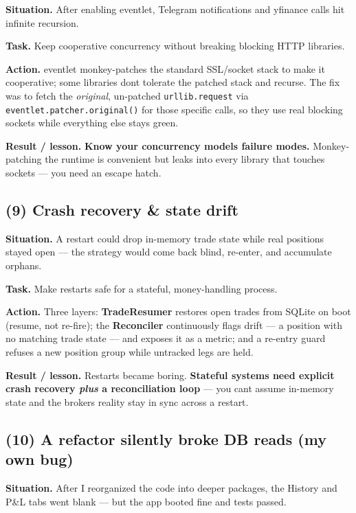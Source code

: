 \documentclass[11pt]{article}
\begin{document}
\textbf{Situation.} After enabling eventlet, Telegram notifications and yfinance calls hit infinite
recursion.

\textbf{Task.} Keep cooperative concurrency without breaking blocking HTTP libraries.

\textbf{Action.} eventlet monkey-patches the standard SSL/socket stack to make it cooperative; some
libraries don\textquotesingle t tolerate the patched stack and recurse. The fix was to fetch the \emph{original},
un-patched \texttt{urllib.request} via \texttt{eventlet.patcher.original()} for those specific calls, so they
use real blocking sockets while everything else stays green.

\textbf{Result / lesson.} \textbf{Know your concurrency model\textquotesingle s failure modes.} Monkey-patching the runtime
is convenient but leaks into every library that touches sockets --- you need an escape hatch.

\subsection{(9) Crash recovery \& state drift}\label{9-crash-recovery--state-drift}

\textbf{Situation.} A restart could drop in-memory trade state while real positions stayed open ---
the strategy would come back blind, re-enter, and accumulate orphans.

\textbf{Task.} Make restarts safe for a stateful, money-handling process.

\textbf{Action.} Three layers: \textbf{TradeResumer} restores open trades from SQLite on boot (resume, not
re-fire); the \textbf{Reconciler} continuously flags drift --- a position with no matching trade state ---
and exposes it as a metric; and a re-entry guard refuses a new position group while untracked
legs are held.

\textbf{Result / lesson.} Restarts became boring. \textbf{Stateful systems need explicit crash recovery
\emph{plus} a reconciliation loop} --- you can\textquotesingle t assume in-memory state and the broker\textquotesingle s reality stay
in sync across a restart.

\subsection{(10) A refactor silently broke DB reads (my own bug)}\label{10-a-refactor-silently-broke-db-reads-my-own-bug}

\textbf{Situation.} After I reorganized the code into deeper packages, the History and P\&L tabs went
blank --- but the app booted fine and tests passed.
\end{document}
